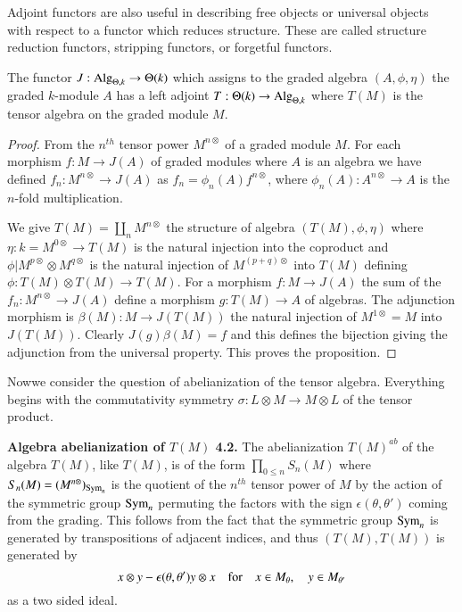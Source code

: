 Adjoint functors are also useful in describing free objects or
universal objects with respect to a functor which reduces
structure. These are called structure reduction functors, stripping
functors, or forgetful functors.

\begin{proposition}\label{chap2-prop4.1}
The functor $J:\operatorname{Alg}_{\Theta,k}\to \Theta(k)$ which assigns to the
graded algebra $(A,\phi,\eta)$ the graded $k$-module $A$ has a left
adjoint $T:\Theta(k)\to \operatorname{Alg}_{\Theta,k}$ where $T(M)$ is the tensor
algebra on the graded module $M$.
\end{proposition}

\begin{proof}
From the $n^{th}$ tensor power $M^{n\otimes}$ of a graded module
$M$. For each morphism $f:M\to J(A)$ of graded modules where $A$ is an
algebra we have defined $f_{n}:M^{n\otimes}\to J(A)$ as
$f_{n}=\phi_{n}(A)f^{n\otimes}$, where $\phi_{n}(A):A^{n\otimes}\to A$
is the $n$-fold multiplication.

We give $T(M)=\displaystyle{\coprod_{n}}M^{n\otimes}$ the structure of algebra
$(T(M),\phi,\eta)$ where $\eta:k=M^{0\otimes}\to T(M)$ is the natural
injection into the coproduct and $\phi|M^{p\otimes}\otimes
M^{q\otimes}$ is the natural injection of $M^{(p+q)\otimes}$ into
$T(M)$ defining $\phi:T(M)\otimes T(M)\to T(M)$. For a morphism
$f:M\to J(A)$ the sum of the $f_{n}:M^{n\otimes}\to J(A)$ define a
morphism $g:T(M)\to A$ of algebras. The adjunction morphism is
$\beta(M):M\to J(T(M))$ the natural injection of $M^{1\otimes}=M$ into
$J(T(M))$. Clearly $J(g)\beta(M)=f$ and this defines the bijection
giving the adjunction from the universal property. This proves the
proposition. 
\end{proof}

Now\pageoriginale we consider the question of abelianization of the
tensor algebra. Everything begins with the commutativity symmetry
$\sigma:L\otimes M\to M\otimes L$ of the tensor product.

\medskip
\noindent
{\bf Algebra abelianization of {\boldmath$T(M)$} 4.2.}
The abelianization $T(M)^{ab}$ of the algebra $T(M)$, like $T(M)$, is
of the form $\prod\limits_{0\leq n}S_{n}(M)$ where
$S_{n}(M)=(M^{n\otimes})_{\operatorname{Sym}_{n}}$ is the quotient of the $n^{th}$
tensor power of $M$ by the action of the symmetric group $\operatorname{Sym}_{n}$
permuting the factors with the sign $\epsilon(\theta,\theta')$ coming
from the grading. This follows from the fact that the symmetric group
$\operatorname{Sym}_{n}$ is generated by transpositions of adjacent indices, and
thus $(T(M),T(M))$ is generated by
$$
x\otimes y-\epsilon(\theta,\theta')y\otimes x\quad\text{for}\quad x\in
M_{\theta},\quad y\in M_{\theta'}
$$
as a two sided ideal.

